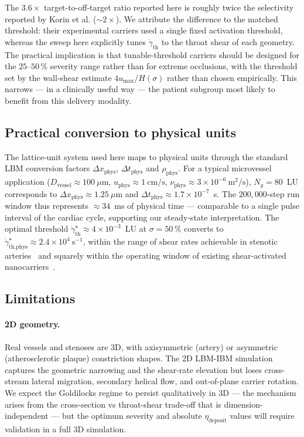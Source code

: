\documentclass[11pt,a4paper]{article}
\begin{document}
The $3.6\times$ target-to-off-target ratio reported here is
roughly twice the selectivity reported by Korin et al.
($\sim 2\times$). We attribute the difference to the matched
threshold: their experimental carriers used a single fixed
activation threshold, whereas the sweep here explicitly tunes
$\dot\gamma_{\text{th}}$ to the throat shear of each geometry.
The practical implication is that tunable-threshold carriers
should be designed for the $25\text{--}50\,\%$ severity range
rather than for extreme occlusions, with the threshold set by
the wall-shear estimate $4 u_{\max}/H(\sigma)$ rather than chosen
empirically. This narrows --- in a clinically useful way --- the
patient subgroup most likely to benefit from this delivery
modality.

\subsection{Practical conversion to physical units}
\label{sec:disc-units}

The lattice-unit system used here maps to physical units through
the standard LBM conversion factors $\Delta x_{\text{phys}}$,
$\Delta t_{\text{phys}}$ and $\rho_{\text{phys}}$. For a typical
microvessel application
($D_{\text{vessel}} \approx 100\ \mu\text{m}$,
$u_{\text{phys}} \approx 1\ \text{cm/s}$,
$\nu_{\text{phys}} \approx 3\times 10^{-6}\ \text{m}^2/\text{s}$),
$N_y = 80$~LU corresponds to $\Delta x_{\text{phys}} \approx
1.25\ \mu\text{m}$ and $\Delta t_{\text{phys}} \approx
1.7\times 10^{-7}$~s. The $200{,}000$-step run window thus
represents ${\approx}34$~ms of physical time --- comparable to a
single pulse interval of the cardiac cycle, supporting our
steady-state interpretation. The optimal threshold
$\dot\gamma_{\text{th}}^{\star} \approx 4\times 10^{-3}$~LU at
$\sigma = 50\,\%$ converts to
$\dot\gamma_{\text{th,phys}}^{\star} \approx 2.4\times 10^{4}\
\text{s}^{-1}$, within the range of shear rates achievable in
stenotic arteries~\citep{wootton1999fluid} and squarely within
the operating window of existing shear-activated
nanocarriers~\citep{korin2012shear,anselmo2017impact}.

\subsection{Limitations}
\label{sec:disc-limits}

\paragraph{2D geometry.} Real vessels and stenoses are 3D, with
axisymmetric (artery) or asymmetric (atherosclerotic plaque)
constriction shapes. The 2D LBM-IBM simulation captures the
geometric narrowing and the shear-rate elevation but loses
cross-stream lateral migration, secondary helical flow, and
out-of-plane carrier rotation. We expect the Goldilocks regime
to persist qualitatively in 3D --- the mechanism arises from
the cross-section vs throat-shear trade-off that is dimension-
independent --- but the optimum severity and absolute
$\eta_{\text{deposit}}$ values will require validation in a
full 3D simulation.
\end{document}
